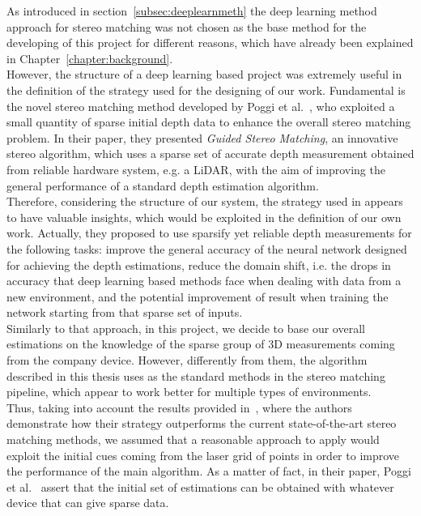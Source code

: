 As introduced in section~\ref{subsec:deeplearnmeth} the deep learning method approach for stereo matching was not chosen as the base method for the developing of this project for different reasons, which have already been explained in Chapter~\ref{chapter:background}.\\
However, the structure of a deep learning based project was extremely useful in the definition of the strategy used for the designing of our work.
Fundamental is the novel stereo matching method developed by Poggi et al.~\cite{Poggi2019}, who exploited a small quantity of sparse initial depth data to enhance the overall stereo matching problem.
In their paper, they presented \textit{Guided Stereo Matching}, an innovative stereo algorithm, which uses a sparse set of accurate depth measurement obtained from reliable hardware system, e.g. a LiDAR, with the aim of improving the general performance of a standard depth estimation algorithm.\\
Therefore, considering the structure of our system, the strategy used in \cite{Poggi2019} appears to have valuable insights, which would be exploited in the definition of our own work.
Actually, they proposed to use sparsify yet reliable depth measurements for the following tasks: improve the general accuracy of the neural network designed for achieving the depth estimations, reduce the domain shift, i.e. the drops in accuracy that deep learning based methods face when dealing with data from a new environment, and the potential improvement of result when training the network starting from that sparse set of inputs.\\
Similarly to that approach, in this project, we decide to base our overall estimations on the knowledge of the sparse group of 3D measurements coming from the company device.
However, differently from them, the algorithm described in this thesis uses as the standard methods in the  stereo matching pipeline, which appear to work better for multiple types of environments. \\
Thus, taking into account the results provided in~\cite{Poggi2019}, where the authors demonstrate how their strategy outperforms the current state-of-the-art stereo matching methods, we assumed that a reasonable approach to apply would exploit the initial cues coming from the laser grid of points in order to improve the performance of the main algorithm. 
As a matter of fact, in their paper, Poggi et al.~\cite{Poggi2019} assert that the initial set of estimations can be obtained with whatever device that can give sparse data.\\

